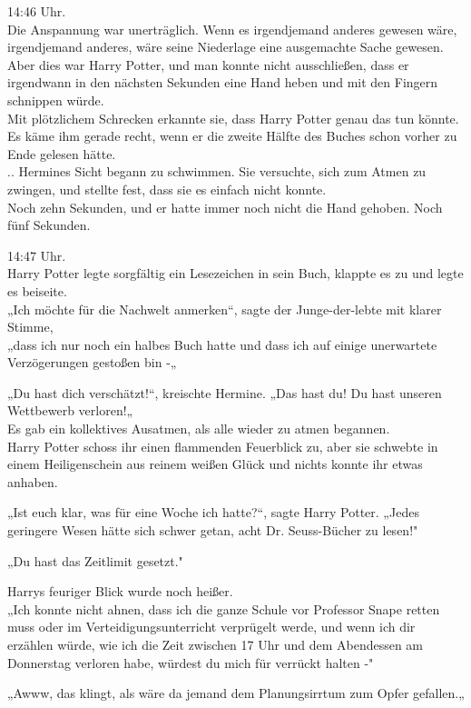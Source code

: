 {14:46 Uhr.\\ Die Anspannung war unerträglich. Wenn es irgendjemand anderes gewesen wäre, irgendjemand anderes, wäre seine Niederlage eine ausgemachte Sache gewesen.\\ Aber dies war Harry Potter, und man konnte nicht ausschließen, dass er irgendwann in den nächsten Sekunden eine Hand heben und mit den Fingern schnippen würde.\\ Mit plötzlichem Schrecken erkannte sie, dass Harry Potter genau das tun könnte. Es käme ihm gerade recht, wenn er die zweite Hälfte des Buches schon vorher zu Ende gelesen hätte.\\ .. Hermines Sicht begann zu schwimmen. Sie versuchte, sich zum Atmen zu zwingen, und stellte fest, dass sie es einfach nicht konnte.\\ Noch zehn Sekunden, und er hatte immer noch nicht die Hand gehoben. Noch fünf Sekunden.

14:47 Uhr.\\ Harry Potter legte sorgfältig ein Lesezeichen in sein Buch, klappte es zu und legte es beiseite.\\ „Ich möchte für die Nachwelt anmerken“, sagte der Junge-der-lebte mit klarer Stimme,\\ „dass ich nur noch ein halbes Buch hatte und dass ich auf einige unerwartete Verzögerungen gestoßen bin -„

„Du hast dich verschätzt!“, kreischte Hermine. „Das hast du! Du hast unseren Wettbewerb verloren!„\\ Es gab ein kollektives Ausatmen, als alle wieder zu atmen begannen.\\ Harry Potter schoss ihr einen flammenden Feuerblick zu, aber sie schwebte in einem Heiligenschein aus reinem weißen Glück und nichts konnte ihr etwas anhaben.

„Ist euch klar, was für eine Woche ich hatte?“, sagte Harry Potter. „Jedes geringere Wesen hätte sich schwer getan, acht Dr. Seuss-Bücher zu lesen!"

„Du hast das Zeitlimit gesetzt."

Harrys feuriger Blick wurde noch heißer.\\ „Ich konnte nicht ahnen, dass ich die ganze Schule vor Professor Snape retten muss oder im Verteidigungsunterricht verprügelt werde, und wenn ich dir erzählen würde, wie ich die Zeit zwischen 17 Uhr und dem Abendessen am Donnerstag verloren habe, würdest du mich für verrückt halten -"

„Awww, das klingt, als wäre da jemand dem Planungsirrtum zum Opfer gefallen.„

}
